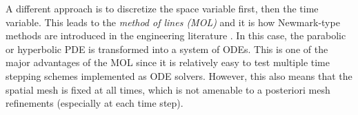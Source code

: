 \documentclass{sfuthesis}
\numberwithin{equation}{section}
\numberwithin{figure}{chapter}
\numberwithin{table}{chapter}
\theoremstyle{definition}
\begin{document}
A different approach is to discretize the space variable first, then the time variable. This leads to the \textit{method of lines (MOL)} \cite{LeVequeBook} and it is how Newmark-type methods are introduced in the engineering literature \cite{HughesBook}. In this case, the parabolic or hyperbolic PDE is transformed into a system of ODEs. This is one of the major advantages of the MOL since it is relatively easy to test multiple time stepping schemes implemented as ODE solvers. However, this also means that the spatial mesh is fixed at all times, which is not amenable to a posteriori mesh refinements (especially at each time step).






\end{document}
